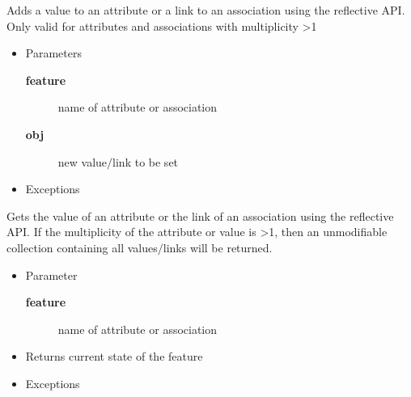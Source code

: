 \begin{desc}Adds a value to an attribute or a link to an association using the
 reflective API. Only valid for attributes and associations with
 multiplicity \textgreater  1
\begin{itemize}
\item{Parameters
  \begin{description}
   \item[{\bf feature}]{name of attribute or association}
   \item[{\bf obj}]{new value$/$link to be set}
  \end{description}}
\end{itemize}
\begin{itemize}
\item{{Exceptions}
}
\end{itemize}
\end{desc}

\begin{desc}Gets the value of an attribute or the link of an association using the
 reflective API. If the multiplicity of the attribute or value is \textgreater  1,
 then an unmodifiable collection containing all values$/$links will be
 returned.
\begin{itemize}
\item{Parameter
  \begin{description}
   \item[{\bf feature}]{name of attribute or association}
  \end{description}}
\end{itemize}
\begin{itemize}
\item{Returns current state of the feature }
\item{{Exceptions}
}
\end{itemize}
\end{desc}


